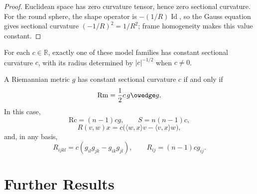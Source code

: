 \begin{proof}
\sketch
Euclidean space has zero curvature tensor, hence zero sectional curvature.
For the round sphere, the shape operator is $-(1/R)\operatorname{Id}$, so the
Gauss equation gives sectional curvature $(-1/R)^2=1/R^2$; frame homogeneity
makes this value constant.
\end{proof}

For each $c\in\mathbb R$, exactly one of these model families has constant
sectional curvature $c$, with its radius determined by $|c|^{-1/2}$ when
$c\ne0$.

\begin{proposition}
\label{prop:constant-sectional-curvature}
A Riemannian metric $g$ has constant sectional curvature $c$ if and only if
\[
\mathrm{Rm}=\frac12c\,g\owedge g.
\]
In this case,
\[
\mathrm{Rc}=(n-1)cg,
\qquad
S=n(n-1)c,
\]
\[
R(v,w)x=c\bigl(\langle w,x\rangle v-\langle v,x\rangle w\bigr),
\]
and, in any basis,
\[
R_{ijkl}=c(g_{il}g_{jk}-g_{ik}g_{jl}),
\qquad
R_{ij}=(n-1)cg_{ij}.
\]
\end{proposition}
\section{Further Results}

